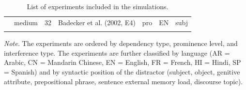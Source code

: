 \documentclass{cambridge7A}\usepackage[]{graphicx}\usepackage[]{color}
\begin{document}
\begin{subappendices}
\begin{table}[!htbp]
{\begin{tabular}{llrllll}
               & medium         & 32    & Badecker et al. (2002, E4)          & pro     & EN   & subj \\
&&&&&& \\
\end{tabular}
\begin{tablenotes}
\item \emph{Note.} The experiments are ordered by dependency type, prominence level, and interference type. 
The experiments are further classified by language (AR = Arabic, CN = Mandarin Chinese, EN = English, FR = French, HI = Hindi, SP = Spanish) and by syntactic position of the distractor (subject, object, genitive attribute, prepositional phrase, sentence external memory load, discourse topic). 
\end{tablenotes}
}
\caption{List of experiments included in the simulations.}\label{tab:exps}
\end{table}



\end{subappendices}
\end{document}
